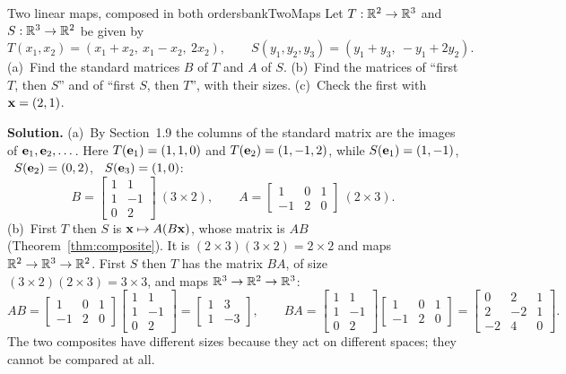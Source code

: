 \documentclass[11pt]{article}
\begin{document}
\begin{exmp}{Two linear maps, composed in both orders}{bankTwoMaps}
Let $T:\mathbb{R}^2\to\mathbb{R}^3$ and $S:\mathbb{R}^3\to\mathbb{R}^2$ be given by
\[
T(x_1,x_2)=(x_1+x_2,\ x_1-x_2,\ 2x_2),\qquad S(y_1,y_2,y_3)=(y_1+y_3,\ -y_1+2y_2).
\]
(a)~Find the standard matrices $B$ of $T$ and $A$ of $S$. (b)~Find the matrices of ``first $T$, then $S$'' and of ``first $S$, then $T$'', with their sizes. (c)~Check the first with $\mathbf{x}=(2,1)$.

\textbf{Solution.} (a)~By Section~1.9 the columns of the standard matrix are the images of $\mathbf{e}_1,\mathbf{e}_2,\dots$. Here $T(\mathbf{e}_1)=(1,1,0)$ and $T(\mathbf{e}_2)=(1,-1,2)$, while $S(\mathbf{e}_1)=(1,-1)$, \ $S(\mathbf{e}_2)=(0,2)$, \ $S(\mathbf{e}_3)=(1,0)$:
\[
B=\begin{bmatrix}1&1\\1&-1\\0&2\end{bmatrix}\ (3\times2),\qquad A=\begin{bmatrix}1&0&1\\-1&2&0\end{bmatrix}\ (2\times3).
\]
(b)~First $T$ then $S$ is $\mathbf{x}\mapsto A(B\mathbf{x})$, whose matrix is $AB$ (Theorem~\ref{thm:composite}). It is $(2\times3)(3\times2)=2\times2$ and maps $\mathbb{R}^2\to\mathbb{R}^3\to\mathbb{R}^2$. First $S$ then $T$ has the matrix $BA$, of size $(3\times2)(2\times3)=3\times3$, and maps $\mathbb{R}^3\to\mathbb{R}^2\to\mathbb{R}^3$:
\[
AB=\begin{bmatrix}1&0&1\\-1&2&0\end{bmatrix}\begin{bmatrix}1&1\\1&-1\\0&2\end{bmatrix}=\begin{bmatrix}1&3\\1&-3\end{bmatrix},\qquad
BA=\begin{bmatrix}1&1\\1&-1\\0&2\end{bmatrix}\begin{bmatrix}1&0&1\\-1&2&0\end{bmatrix}=\begin{bmatrix}0&2&1\\2&-2&1\\-2&4&0\end{bmatrix}.
\]
The two composites have different sizes because they act on different spaces; they cannot be compared at all.


\end{exmp}
\end{document}
